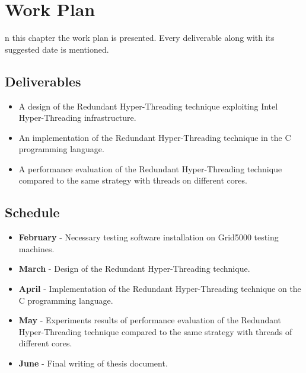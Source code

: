 %
%
\let\textcircled=\pgftextcircled
\chapter{Work Plan}
\label{chap:workPlan}
n this chapter the work plan is presented. Every deliverable along with its suggested date is mentioned. 

\section{Deliverables}
\label{sec:deliverables}

\begin{itemize}
\item A design of the Redundant Hyper-Threading technique exploiting Intel Hyper-Threading infrastructure. 
\item An implementation of the Redundant Hyper-Threading technique in the C programming language. 
\item A performance evaluation of the Redundant Hyper-Threading technique compared to the same strategy with threads on different cores. 
\end{itemize}

\section{Schedule}
\label{sec:schedule}

\begin{itemize}
\item \textbf{February} - Necessary testing software installation on Grid5000 testing machines. 
\item \textbf{March} - Design of the Redundant Hyper-Threading technique. 
\item \textbf{April} - Implementation of the Redundant Hyper-Threading technique on the C programming language. 
\item \textbf{May} -  Experiments results of performance evaluation of the Redundant Hyper-Threading technique compared to the same strategy with threads of different cores. 
\item \textbf{June} - Final writing of thesis document. 
\end{itemize}











